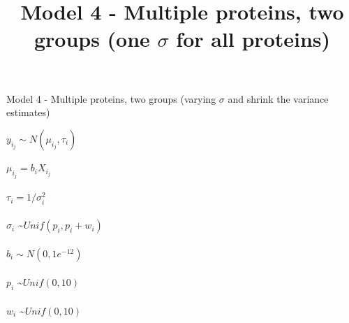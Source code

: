 \documentclass[12pt]{article}
\title{Model 4 - Multiple proteins, two groups (one $\sigma$ for all proteins)}
\begin{document}
\begin{center}{\LARGE Model 4 - Multiple proteins, two groups (varying $\sigma$ and shrink the variance estimates)}\end{center} 

\hspace{0.2in}

$y_i_j \sim N(\mu_i_j, \tau_i)$ 
\\

\\
$\mu_i_j = b_iX_i_j$
\\

\\
$\tau_i= 1/\sigma_i^2$
\\

\\
$\sigma_i$ \sim $Unif(p_i, p_i+w_i)$
\\

\\
$b_i \sim N(0, 1e^{-12})$
\\

\\
$p_i$ \sim $Unif(0, 10)$
\\

\\
$w_i$ \sim $Unif(0, 10)$
\\

\\
\\
%
\\
\\
%
\\

\\

\\
\end{document}
